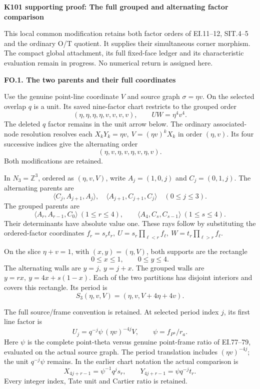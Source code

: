\par\bigskip\noindent\textbf{K101 supporting proof: The full grouped and alternating factor comparison}\par\nobreak
This local common modification retains both factor orders of EI.11--12,
SIT.4--5 and the ordinary O/T quotient. It supplies their simultaneous
corner morphism. The compact global attachment, its full fixed-face
ledger and its characteristic evaluation remain in progress. No
numerical return is assigned here.

\par

\medskip\noindent\textbf{FO.1. The two parents and their full coordinates}

\par\nobreak

Use the genuine point-line coordinate \(V\) and source graph
\(\sigma=\eta v\). On the selected overlap \(q\) is a unit. Its
saved nine-factor chart restricts to the grouped order
\[
 (\eta,\eta,\eta,\eta,v,v,v,v),\qquad UW=\eta^4v^4.             \tag{FO.1}
\]
The deleted \(q\) factor remains in the unit arrow below.
The ordinary associated-node resolution resolves each
\(X_kY_k=\eta v,\ V=(\eta v)^kX_k\) in order \((\eta,v)\).
Its four successive indices give the alternating order
\[
 (\eta,v,\eta,v,\eta,v,\eta,v).                              \tag{FO.2}
\]
Both modifications are retained.

In \(N_3=\mathbb Z^3\), ordered as \((\eta,v,V)\), write
\(A_j=(1,0,j)\) and \(C_j=(0,1,j)\). The alternating parents are
\[
 \langle C_j,A_{j+1},A_j\rangle,\quad
 \langle A_{j+1},C_{j+1},C_j\rangle \quad(0\le j\le3).         \tag{FO.3}
\]
The grouped parents are
\[
 \langle A_r,A_{r-1},C_0\rangle\ (1\le r\le4),\qquad
 \langle A_4,C_s,C_{s-1}\rangle\ (1\le s\le4).               \tag{FO.4}
\]
Their determinants have absolute value one. These rays follow
by substituting the ordered-factor coordinates
\(f_r=s_rt_r,\ U=s_r\prod_{\ell<r}f_\ell,\
W=t_r\prod_{\ell>r}f_\ell\).

On the slice \(\eta+v=1\), with \((x,y)=(\eta,V)\), both
supports are the rectangle
\[
 0\le x\le1,\qquad0\le y\le4.                               \tag{FO.5}
\]
The alternating walls are \(y=j,\ y=j+x\). The grouped
walls are \(y=rx,\ y=4x+s(1-x)\). Each of the two
partitions has disjoint interiors and covers this rectangle.
Its period is
\[
 S_3(\eta,v,V)=(\eta,v,V+4\eta+4v).                         \tag{FO.6}
\]

The full source/frame convention is retained. At selected
period index \(j\), its first line factor is
\[
 U_j=q^{-j}\psi\,(\eta v)^{-4j}V,\qquad
 \psi=f_{P^a}/r_a.                                        \tag{FO.7}
\]
Here \(\psi\) is the complete point-theta versus genuine
point-frame ratio of EI.77--79, evaluated on the actual
source graph. The period translation includes
\((\eta v)^{-4j}\); the unit \(q^{-j}\psi\) remains.
In the earlier chart notation the actual comparison is
\[
 X_{4j+r-1}=\psi^{-1}q^j s_r,\qquad
 Y_{4j+r-1}=\psi q^{-j}t_r.                                \tag{FO.8}
\]
Every integer index, Tate unit and Cartier ratio is retained.

